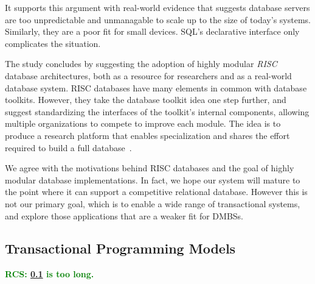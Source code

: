 \documentclass[letterpaper,twocolumn,10pt]{article}
\newcommand{\rcs}[1]{\textcolor{green}{\bf RCS: #1}}
\begin{document}
It supports this argument with real-world evidence that suggests
database servers are too unpredictable and unmanagable to
scale up to the size of today's systems.  Similarly, they are a poor fit
for small devices.  SQL's declarative interface only complicates the
situation.



The study concludes by suggesting the adoption of highly modular {\em
RISC} database architectures, both as a resource for researchers and
as a real-world database system.  RISC databases have many elements in
common with database toolkits.  However, they take the database
toolkit idea one step further, and suggest standardizing the
interfaces of the toolkit's internal components, allowing multiple
organizations to compete to improve each module.  The idea is to
produce a research platform that enables specialization and shares the
effort required to build a full database~\cite{riscDB}.

We agree with the motivations behind RISC databases and the goal
of highly modular database implementations.  In fact, we  hope
 our system will mature to the point where it can support a
competitive relational database.  However this is not our primary
goal, which is to enable a wide range of transactional systems, and
explore those applications that are a weaker fit for DMBSs.




\subsection{Transactional Programming Models}

\label{sec:transactionalProgramming}

\rcs{\ref{sec:transactionalProgramming} is too long.}
\end{document}
